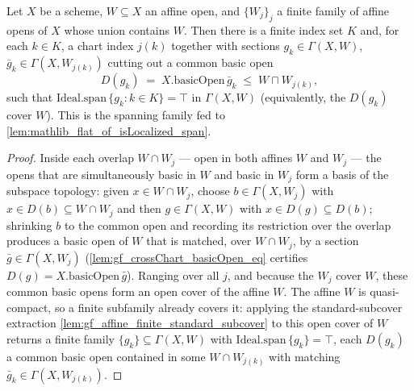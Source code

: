 \begin{lemma}
  \label{lem:gf_crossChart_spanning_cover}
  Let \(X\) be a scheme, \(W \subseteq X\) an affine open, and \(\{W_j\}_{j}\) a finite family of
  affine opens of \(X\) whose union contains \(W\). Then there is a finite index set \(K\) and, for
  each \(k \in K\), a chart index \(j(k)\) together with sections \(g_k \in \Gamma(X, W)\),
  \(\bar g_k \in \Gamma(X, W_{j(k)})\) cutting out a common basic open
  \[
    D(g_k) \;=\; X.\mathrm{basicOpen}\,\bar g_k \;\le\; W \sqcap W_{j(k)},
  \]
  such that \(\mathrm{Ideal.span}\,\{g_k : k \in K\} = \top\) in \(\Gamma(X, W)\) (equivalently, the
  \(D(g_k)\) cover \(W\)). This is the spanning family fed to
  \cref{lem:mathlib_flat_of_isLocalized_span}.
\end{lemma}

\begin{proof}
  \leanok
  Inside each overlap \(W \cap W_j\) — open in both affines \(W\) and \(W_j\) — the opens that are
  simultaneously basic in \(W\) and basic in \(W_j\) form a basis of the subspace topology: given
  \(x \in W \cap W_j\), choose \(b \in \Gamma(X, W_j)\) with \(x \in D(b) \subseteq W \cap W_j\) and
  then \(g \in \Gamma(X, W)\) with \(x \in D(g) \subseteq D(b)\); shrinking \(b\) to the common open
  and recording its restriction over the overlap produces a basic open of \(W\) that is matched, over
  \(W \cap W_j\), by a section \(\bar g \in \Gamma(X, W_j)\) (\cref{lem:gf_crossChart_basicOpen_eq}
  certifies \(D(g) = X.\mathrm{basicOpen}\,\bar g\)). Ranging over all \(j\), and because the \(W_j\)
  cover \(W\), these common basic opens form an open cover of the affine \(W\). The affine \(W\) is
  quasi-compact, so a finite subfamily already covers it: applying the standard-subcover extraction
  \cref{lem:gf_affine_finite_standard_subcover} to this open cover of \(W\) returns a finite family
  \(\{g_k\} \subseteq \Gamma(X, W)\) with \(\mathrm{Ideal.span}\,\{g_k\} = \top\), each \(D(g_k)\) a
  common basic open contained in some \(W \cap W_{j(k)}\) with matching
  \(\bar g_k \in \Gamma(X, W_{j(k)})\).
\end{proof}



